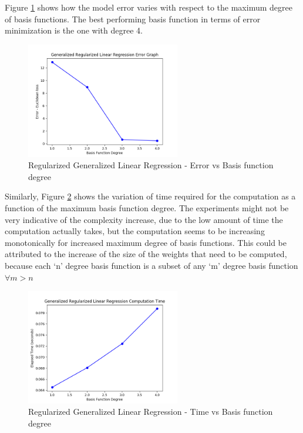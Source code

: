 \documentclass[parskip=full]{scrartcl}
\begin{document}
        Figure \ref{fig:rglg_err_v_deg} shows how the model error varies with respect to the maximum degree of basis functions. The best performing basis function in terms of error minimization is the one with degree 4.

        \begin{figure}[ht]
            \centering
            \includegraphics[width=0.6\textwidth]{3a_degree_vs_error.png}
            \caption{Regularized Generalized Linear Regression - Error vs Basis function degree}
            \label{fig:rglg_err_v_deg}
        \end{figure}

        Similarly, Figure \ref{fig:rglg_time_v_deg} shows the variation of time required for the computation as a function of the maximum basis function degree. The experiments might not be very indicative of the complexity increase, due to the low amount of time the computation actually takes, but the computation seems to be increasing monotonically for increased maximum degree of basis functions. This could be attributed to the increase of the size of the weights that need to be computed, because each `n' degree basis function is a subset of any `m' degree basis function $\forall m > n$

        \begin{figure}[ht]
            \centering
            \includegraphics[width=0.6\textwidth]{3a_degree_vs_time.png}
            \caption{Regularized Generalized Linear Regression - Time vs Basis function degree}
            \label{fig:rglg_time_v_deg}
        \end{figure}
\end{document}
